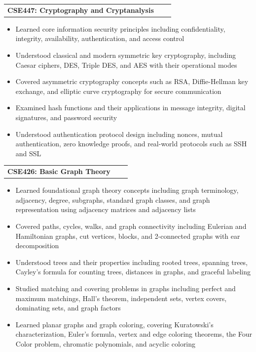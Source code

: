 \documentclass[a4paper,12pt]{article}
\makeatletter
\newenvironment{joblong}[2]
    {
    \begin{tabularx}{\linewidth}{@{}l X r@{}}
    \textbf{#1} & \hfill &  #2 \\[3.75pt]
    \end{tabularx}
    \begin{minipage}[t]{\linewidth}
    \begin{itemize}[nosep,after=\strut, leftmargin=1em, itemsep=3pt,label=--]
    }
    {
    \end{itemize}
    \end{minipage}    
    }
\makeatother
\begin{document}
\begin{joblong}{CSE447: Cryptography and Cryptanalysis}{}
    \item Learned core information security principles including confidentiality, integrity, availability, authentication, and access control
    \item Understood classical and modern symmetric key cryptography, including Caesar ciphers, DES, Triple DES, and AES with their operational modes
    \item Covered asymmetric cryptography concepts such as RSA, Diffie-Hellman key exchange, and elliptic curve cryptography for secure communication
    \item Examined hash functions and their applications in message integrity, digital signatures, and password security
    \item Understood authentication protocol design including nonces, mutual authentication, zero knowledge proofs, and real-world protocols such as SSH and SSL
\end{joblong}

\begin{joblong}{CSE426: Basic Graph Theory}{}
    \item Learned foundational graph theory concepts including graph terminology, adjacency, degree, subgraphs, standard graph classes, and graph representation using adjacency matrices and adjacency lists
    \item Covered paths, cycles, walks, and graph connectivity including Eulerian and Hamiltonian graphs, cut vertices, blocks, and 2-connected graphs with ear decomposition
    \item Understood trees and their properties including rooted trees, spanning trees, Cayley's formula for counting trees, distances in graphs, and graceful labeling
    \item Studied matching and covering problems in graphs including perfect and maximum matchings, Hall's theorem, independent sets, vertex covers, dominating sets, and graph factors
    \item Learned planar graphs and graph coloring, covering Kuratowski's characterization, Euler's formula, vertex and edge coloring theorems, the Four Color problem, chromatic polynomials, and acyclic coloring
\end{joblong}
\end{document}
